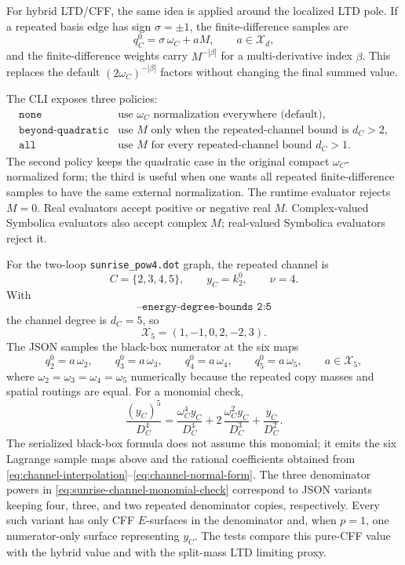 \documentclass[11pt,a4paper]{report}
\newcommand{\Samples}{\mathcal X}
\begin{document}
For hybrid LTD/CFF, the same idea is applied around the localized LTD pole.
If a repeated basis edge has sign \(\sigma=\pm1\), the finite-difference
samples are
\begin{equation}
  q_C^0=\sigma\,\omega_C+aM,\qquad a\in\Samples_d ,
  \label{eq:uniform-hybrid-samples}
\end{equation}
and the finite-difference weights carry \(M^{-|\beta|}\) for a
multi-derivative index \(\beta\).  This replaces the default
\((2\omega_C)^{-|\beta|}\) factors without changing the final summed value.

The CLI exposes three policies:
\[
\begin{array}{ll}
\texttt{none} & \text{use } \omega_C \text{ normalization everywhere
  (default)},\\
\texttt{beyond-quadratic} & \text{use } M \text{ only when the repeated-channel
  bound is } d_C>2,\\
\texttt{all} & \text{use } M \text{ for every repeated-channel bound }
  d_C>1 .
\end{array}
\]
The second policy keeps the quadratic case in the original compact
\(\omega_C\)-normalized form; the third is useful when one wants all repeated
finite-difference samples to have the same external normalization.  The
runtime evaluator rejects \(M=0\).  Real evaluators accept positive or negative
real \(M\).  Complex-valued Symbolica evaluators also accept complex \(M\);
real-valued Symbolica evaluators reject it.

For the two-loop \texttt{sunrise\_pow4.dot} graph, the repeated channel is
\[
  C=\{2,3,4,5\},\qquad y_C=k_2^0,\qquad \nu=4 .
\]
With
\[
  \texttt{--energy-degree-bounds 2:5}
\]
the channel degree is \(d_C=5\), so
\[
  \Samples_5=(1,-1,0,2,-2,3).
\]
The JSON samples the black-box numerator at the six maps
\[
  q_2^0=a\,\omega_2,\qquad
  q_3^0=a\,\omega_3,\qquad
  q_4^0=a\,\omega_4,\qquad
  q_5^0=a\,\omega_5,
  \qquad a\in\Samples_5,
\]
where \(\omega_2=\omega_3=\omega_4=\omega_5\) numerically because the repeated
copy masses and spatial routings are equal.  For a monomial check,
\[
  \frac{(y_C)^5}{D_C^4}
  =
  \frac{\omega_C^4 y_C}{D_C^4}
  +2\,\frac{\omega_C^2 y_C}{D_C^3}
  +\frac{y_C}{D_C^2}.
  \label{eq:sunrise-channel-monomial-check}
\]
The serialized black-box formula does not assume this monomial; it emits the
six Lagrange sample maps above and the rational coefficients obtained from
\eqref{eq:channel-interpolation}--\eqref{eq:channel-normal-form}.  The three
denominator powers in \eqref{eq:sunrise-channel-monomial-check} correspond to
JSON variants keeping four, three, and two repeated denominator copies,
respectively.  Every such variant has only CFF \(E\)-surfaces in the
denominator and, when \(p=1\), one numerator-only surface representing
\(y_C\).  The tests compare this pure-CFF value with the hybrid value and with
the split-mass LTD limiting proxy.
\end{document}

